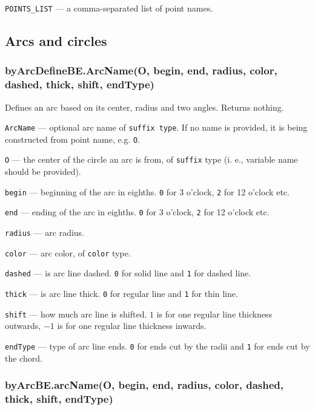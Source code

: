 \documentclass{ltxdoc}
\begin{document}
	\texttt{POINTS\_LIST} — a comma-separated list of point names.


\subsection{Arcs and circles}


\subsubsection{byArcDefineBE.ArcName(O, begin, end, radius, color, dashed, thick, shift, endType)}\label{byArcDefineBE}

Defines an arc based on its center, radius and two angles. Returns nothing.

\texttt{ArcName} — optional arc name of \texttt{suffix type}. If no name is provided, it is being constructed from point name, e.g. \texttt{O}.

\texttt{O} — the center of the circle an arc is from, of \texttt{suffix} type (i. e., variable name should be provided).

\texttt{begin} — beginning of the arc in eighths. \texttt{0} for 3 o'clock, \texttt{2} for 12 o'clock etc.

\texttt{end} — ending of the arc in eighths. \texttt{0} for 3 o'clock, \texttt{2} for 12 o'clock etc.

\texttt{radius} — arc radius.

\texttt{color} — arc color, of \texttt{color} type.

\texttt{dashed} — is arc line dashed. \texttt{0} for solid line and \texttt{1} for dashed line.

\texttt{thick} — is arc line thick. \texttt{0} for regular line and \texttt{1} for thin line.

\texttt{shift} — how much arc line is shifted. \texttt{$1$} is for one regular line thickness outwards, \texttt{$-1$} is for one regular line thickness inwards.

\texttt{endType} — type of arc line ends. \texttt{0} for ends cut by the radii and \texttt{1} for ends cut by the chord.

\subsubsection{byArcBE.arcName(O, begin, end, radius, color, dashed, thick, shift, endType)}\label{byArcBE}
\end{document}
